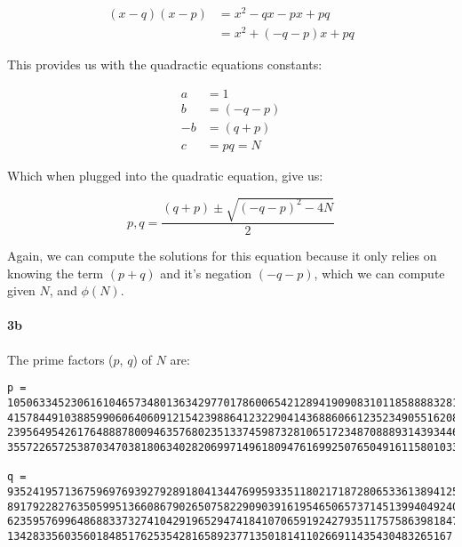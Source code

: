 \documentclass[12pt]{article}
\begin{document}
\begin{align*}
    (x - q)(x - p) &= x^2 - qx - px + pq \\
    &= x^2 + (-q - p)x + pq
\end{align*}

This provides us with the quadractic equations constants:

\begin{align*}
    a &= 1 \\
    b &= (-q - p) \\
   -b &= (q + p) \\
    c &= pq = N
\end{align*}

Which when plugged into the quadratic equation, give us:

\[
    p,q = \frac{(q + p) \pm \sqrt{(-q-p)^2-4N}}{2}
\]

Again, we can compute the solutions for this equation because it only
relies on knowing the term $(p + q)$ and it's negation $(-q - p)$, which
we can compute given $N$, and $\phi{(N)}$.

\paragraph{3b}

The prime factors ($p$, $q$) of $N$ are:

\begin{verbatim}
p = 
1050633452306161046573480136342977017860065421289419090831011858888328139819275
4157844910388599060640609121542398864123229041436886066123523490551620883141000
2395649542617648887800946357680235133745987328106517234870888931439344639465469
355722657253870347038180634028206997149618094761699250765049161158010333

q =
9352419571367596976939279289180413447699593351180217187280653361389412531812702
8917922827635059951366086790265075822909039161954650657371451399404924083352681
6235957699648688337327410429196529474184107065919242793511757586398184746028719
1342833560356018485176253542816589237713501814110266911435430483265167
\end{verbatim}
\end{document}
